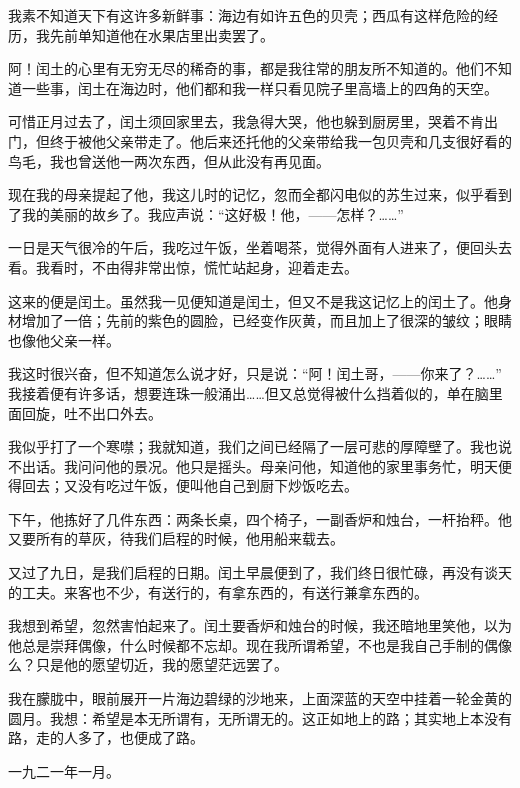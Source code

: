 \documentclass[12pt,UTF8]{ctexbook}
\begin{document}
我素不知道天下有这许多新鲜事：海边有如许五色的贝壳；西瓜有这样危险的经历，我先前单知道他在水果店里出卖罢了。

阿！闰土的心里有无穷无尽的稀奇的事，都是我往常的朋友所不知道的。他们不知道一些事，闰土在海边时，他们都和我一样只看见院子里高墙上的四角的天空。

可惜正月过去了，闰土须回家里去，我急得大哭，他也躲到厨房里，哭着不肯出门，但终于被他父亲带走了。他后来还托他的父亲带给我一包贝壳和几支很好看的鸟毛，我也曾送他一两次东西，但从此没有再见面。

现在我的母亲提起了他，我这儿时的记忆，忽而全都闪电似的苏生过来，似乎看到了我的美丽的故乡了。我应声说：“这好极！他，——怎样？……”

一日是天气很冷的午后，我吃过午饭，坐着喝茶，觉得外面有人进来了，便回头去看。我看时，不由得非常出惊，慌忙站起身，迎着走去。

这来的便是闰土。虽然我一见便知道是闰土，但又不是我这记忆上的闰土了。他身材增加了一倍；先前的紫色的圆脸，已经变作灰黄，而且加上了很深的皱纹；眼睛也像他父亲一样。

我这时很兴奋，但不知道怎么说才好，只是说：“阿！闰土哥，——你来了？……”　　我接着便有许多话，想要连珠一般涌出……但又总觉得被什么挡着似的，单在脑里面回旋，吐不出口外去。

我似乎打了一个寒噤；我就知道，我们之间已经隔了一层可悲的厚障壁了。我也说不出话。我问问他的景况。他只是摇头。母亲问他，知道他的家里事务忙，明天便得回去；又没有吃过午饭，便叫他自己到厨下炒饭吃去。

下午，他拣好了几件东西：两条长桌，四个椅子，一副香炉和烛台，一杆抬秤。他又要所有的草灰，待我们启程的时候，他用船来载去。

又过了九日，是我们启程的日期。闰土早晨便到了，我们终日很忙碌，再没有谈天的工夫。来客也不少，有送行的，有拿东西的，有送行兼拿东西的。

我想到希望，忽然害怕起来了。闰土要香炉和烛台的时候，我还暗地里笑他，以为他总是崇拜偶像，什么时候都不忘却。现在我所谓希望，不也是我自己手制的偶像么？只是他的愿望切近，我的愿望茫远罢了。

我在朦胧中，眼前展开一片海边碧绿的沙地来，上面深蓝的天空中挂着一轮金黄的圆月。我想：希望是本无所谓有，无所谓无的。这正如地上的路；其实地上本没有路，走的人多了，也便成了路。

一九二一年一月。

\backmatter
\end{document}

